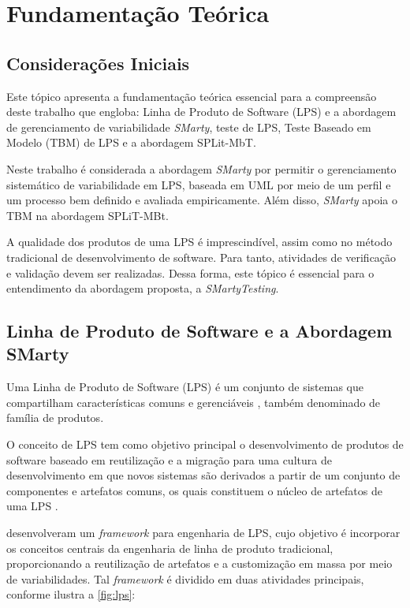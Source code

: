 \chapter{Fundamentação Teórica}
\label{cap2:fundamentacao}
\pagestyle{plain}

\section{Considerações Iniciais}

Este tópico apresenta a fundamentação teórica essencial para a compreensão deste trabalho que engloba: Linha de Produto de Software (LPS) e a abordagem de gerenciamento de variabilidade \textit{SMarty}, teste de LPS, Teste Baseado em Modelo (TBM) de LPS e a abordagem SPLit-MbT.

Neste trabalho é considerada a abordagem \textit{SMarty} por permitir o gerenciamento sistemático de variabilidade em LPS, baseada em UML por meio de um perfil e um processo bem definido e avaliada empiricamente. Além disso, \textit{SMarty} apoia o TBM na abordagem SPLiT-MBt.

A qualidade dos produtos de uma LPS é imprescindível, assim como no método tradicional de desenvolvimento de software. Para tanto, atividades de verificação e validação devem ser realizadas. Dessa forma, este tópico é essencial para o entendimento da abordagem proposta, a \textit{SMartyTesting}.

\section{Linha de Produto de Software e a Abordagem SMarty}
\label{cap2sec:lps}

Uma Linha de Produto de Software (LPS) é um conjunto de sistemas que compartilham características comuns e gerenciáveis \cite{clements2002software}, também denominado de família de produtos.

O conceito de LPS tem como objetivo principal o desenvolvimento de produtos de software baseado em reutilização e a migração para uma cultura de desenvolvimento em que novos sistemas são derivados a partir de um conjunto de componentes e artefatos comuns, os quais constituem o núcleo de artefatos de uma LPS \cite{linden2007product}. 

\citet{pohl2005software} desenvolveram um \textit{framework} para engenharia de LPS, cujo objetivo é incorporar os conceitos centrais da engenharia de linha de produto tradicional, proporcionando a reutilização de artefatos e a customização em massa por meio de variabilidades. Tal \textit{framework} é dividido em duas atividades principais, conforme ilustra a \ref{fig:lps}: 

